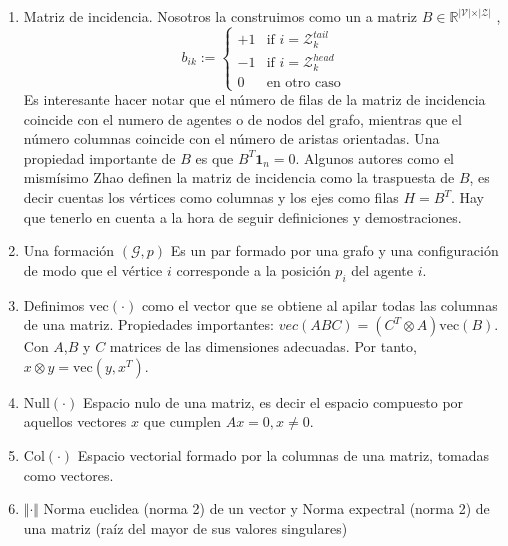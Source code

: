 \documentclass[10pt,a4paper]{article}
\begin{document}
\begin{enumerate}
\item Matriz de incidencia. Nosotros la construimos como un a matriz $B \in \mathbb{R}^{\vert \mathcal{V} \vert \times \vert \mathcal{Z}\vert}$ \cite{Marina2021},
\begin{equation}
b_{ik}:= \left\{ \begin{array}{ll}
+1 & \text{if } i =\mathcal{Z}_k^{tail}\\
-1 & \text{if } i = \mathcal{Z}_k^{head}\\
0  & \text{en otro caso} 
\end{array} \right.
\end{equation} 
Es interesante hacer notar que el número de filas de la matriz de incidencia coincide con el numero de agentes o de nodos del grafo, mientras que el número columnas coincide con el número de aristas orientadas. Una propiedad importante de $B$ es que $B^T\mathbf{1}_n =0$. Algunos autores como el mismísimo Zhao definen la matriz de incidencia como la traspuesta de $B$, es decir cuentas los vértices como columnas y los ejes como filas $H=B^T$. Hay que tenerlo en cuenta a la hora de seguir definiciones y demostraciones.

\item Una formación $(\mathcal{G},p)$ Es un par formado por una grafo y una configuración de modo que el vértice $i$ corresponde a la posición $p_i$ del agente $i$.

\item Definimos $\text{vec}(\cdot)$ como el vector que se obtiene al apilar todas las columnas de una matriz. Propiedades importantes: $vec(ABC) = (C^T \otimes A)\text{vec}(B)$. Con $A$,$B$ y $C$ matrices de las dimensiones adecuadas. Por tanto, $x\otimes y =\text{vec}(y,x^T)$.

\item $\text{Null}(\cdot)$ Espacio nulo de una matriz, es decir el espacio compuesto por aquellos vectores $x$ que cumplen $Ax=0, x \neq 0$.
\item $\text{Col}(\cdot)$ Espacio vectorial formado por la columnas de una matriz, tomadas como vectores.

\item $\Vert \cdot \Vert$ Norma euclidea (norma 2) de un vector y Norma expectral (norma 2) de una matriz (raíz del mayor de sus valores singulares)
\end{enumerate}




\end{document}
